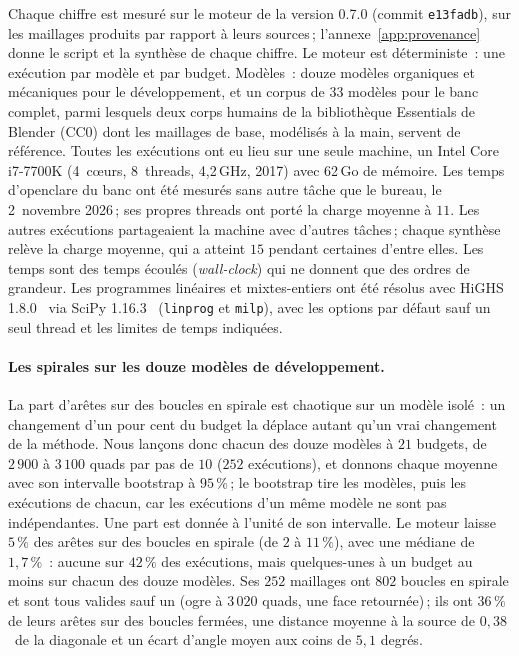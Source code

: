 \documentclass[11pt,a4paper]{article}
\begin{document}
Chaque chiffre est mesuré sur le moteur de la version 0.7.0 (commit
\texttt{e13fadb}), sur les maillages produits par rapport à leurs sources\,;
l'annexe~\ref{app:provenance} donne le script et la synthèse de chaque
chiffre. Le moteur est déterministe~: une exécution par modèle et par
budget. Modèles~: douze modèles organiques et mécaniques pour le
développement, et un corpus de $33$ modèles pour le banc complet, parmi
lesquels deux corps humains de la bibliothèque Essentials de Blender (CC0)
dont les maillages de base, modélisés à la main, servent de référence.
Toutes les exécutions ont eu lieu sur une seule machine, un Intel Core
i7-7700K (4~cœurs, 8~threads, 4,2\,GHz, 2017) avec 62\,Go de mémoire. Les
temps d'openclare du banc ont été mesurés sans autre tâche que le bureau, le 2~novembre
2026\,; ses propres threads ont porté la charge moyenne à $11$. Les autres
exécutions partageaient la machine avec d'autres tâches\,; chaque synthèse
relève la charge moyenne, qui a atteint $15$ pendant certaines d'entre elles.
Les temps sont des temps écoulés (\emph{wall-clock}) qui ne donnent que des
ordres de grandeur.
Les programmes linéaires et mixtes-entiers ont été résolus avec HiGHS
1.8.0~\cite{huangfu2018highs} via SciPy 1.16.3~\cite{virtanen2020scipy}
(\texttt{linprog} et \texttt{milp}), avec les options par défaut sauf un
seul thread et les limites de temps indiquées.

\paragraph{Les spirales sur les douze modèles de développement.}
La part d'arêtes sur des boucles en spirale est chaotique sur un modèle
isolé~: un changement d'un pour cent du budget la déplace autant qu'un vrai
changement de la méthode. Nous lançons donc chacun des douze modèles à
$21$ budgets, de $2\,900$ à $3\,100$ quads par pas de $10$ ($252$
exécutions), et donnons chaque moyenne avec son intervalle bootstrap à
$95\,\%$\,; le bootstrap tire les modèles, puis les exécutions de chacun, car
les exécutions d'un même modèle ne sont pas indépendantes. Une part est
donnée à l'unité de son intervalle. Le moteur laisse $5\,\%$ des arêtes sur
des boucles en spirale (de $2$ à $11\,\%$), avec une médiane de
$1,7\,\%$~: aucune sur $42\,\%$ des exécutions, mais quelques-unes à un
budget au moins sur chacun des douze modèles. Ses $252$ maillages ont $802$
boucles en spirale et sont tous valides sauf un (ogre à $3\,020$ quads, une
face retournée)\,; ils ont $36\,\%$ de leurs arêtes sur des boucles fermées,
une distance moyenne à la source de $0,38$\,\textperthousand\ de la diagonale
et un écart d'angle moyen aux coins de $5,1$ degrés.
\end{document}
